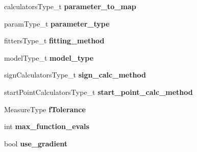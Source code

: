 \begin{DoxyCompactItemize}
\item 
\hypertarget{struct_ox_1_1_tomato_options_a0d4ad4476a8817e68ead08d1b0645033}{calculators\-Type\-\_\-t {\bfseries parameter\-\_\-to\-\_\-map}}\label{struct_ox_1_1_tomato_options_a0d4ad4476a8817e68ead08d1b0645033}

\item 
\hypertarget{struct_ox_1_1_tomato_options_a943b1f0402f72d794bf21c62c3333f8b}{param\-Type\-\_\-t {\bfseries parameter\-\_\-type}}\label{struct_ox_1_1_tomato_options_a943b1f0402f72d794bf21c62c3333f8b}

\item 
\hypertarget{struct_ox_1_1_tomato_options_a2d1d2149185ef71968980cf8c6afcf14}{fitters\-Type\-\_\-t {\bfseries fitting\-\_\-method}}\label{struct_ox_1_1_tomato_options_a2d1d2149185ef71968980cf8c6afcf14}

\item 
\hypertarget{struct_ox_1_1_tomato_options_a4a5e32c79e597006aaaa79600ddaa564}{model\-Type\-\_\-t {\bfseries model\-\_\-type}}\label{struct_ox_1_1_tomato_options_a4a5e32c79e597006aaaa79600ddaa564}

\item 
\hypertarget{struct_ox_1_1_tomato_options_a2cf923d6d04fb8cb510db2623e93119d}{sign\-Calculators\-Type\-\_\-t {\bfseries sign\-\_\-calc\-\_\-method}}\label{struct_ox_1_1_tomato_options_a2cf923d6d04fb8cb510db2623e93119d}

\item 
\hypertarget{struct_ox_1_1_tomato_options_a9da2993961d10c848b0860284900c869}{start\-Point\-Calculators\-Type\-\_\-t {\bfseries start\-\_\-point\-\_\-calc\-\_\-method}}\label{struct_ox_1_1_tomato_options_a9da2993961d10c848b0860284900c869}

\item 
\hypertarget{struct_ox_1_1_tomato_options_ae2ac4c46e46b4d183c6944771701040b}{Measure\-Type {\bfseries f\-Tolerance}}\label{struct_ox_1_1_tomato_options_ae2ac4c46e46b4d183c6944771701040b}

\item 
\hypertarget{struct_ox_1_1_tomato_options_a9b864c01b6b0b4e4d5a56470f6c5f004}{int {\bfseries max\-\_\-function\-\_\-evals}}\label{struct_ox_1_1_tomato_options_a9b864c01b6b0b4e4d5a56470f6c5f004}

\item 
\hypertarget{struct_ox_1_1_tomato_options_a367c540e5413f8ffa3a6bc6ef5781b45}{bool {\bfseries use\-\_\-gradient}}\label{struct_ox_1_1_tomato_options_a367c540e5413f8ffa3a6bc6ef5781b45}


\end{DoxyCompactItemize}

